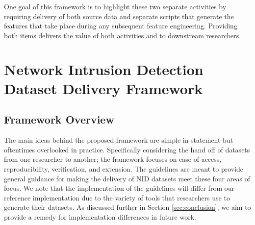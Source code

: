 \documentclass[conference]{IEEEtran}
\begin{document}
One goal of this framework is to highlight these two separate activities by requiring delivery of both source data and separate scripts that generate the features that take place during any subsequent feature engineering.
Providing both items delivers the value of both activities and to downstream researchers.

\section{Network Intrusion Detection Dataset Delivery Framework}\label{sec:nidddf}

\subsection{Framework Overview}\label{subsec:framework_overview}
The main ideas behind the proposed framework are simple in statement but oftentimes overlooked in practice.
Specifically considering the hand off of datasets from one researcher to another; the framework focuses on ease of access, reproducibility, verification, and extension.
The guidelines are meant to provide general guidance for making the delivery of NID datasets meet these four areas of focus.
We note that the implementation of the guidelines will differ from our reference implementation due to the variety of tools that researchers use to generate their datasets.
As discussed further in Section \ref{sec:conclusion}, we aim to provide a remedy for implementation differences in future work.
\end{document}
